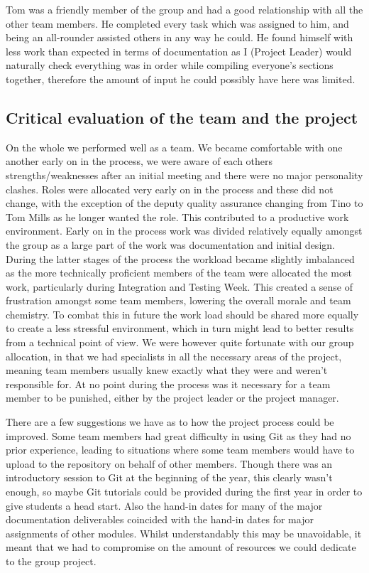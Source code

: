 \documentclass{project}
\begin{document}
Tom was a friendly member of the group and had a good relationship with all the other team members. He completed every task which was assigned to him, and being an all-rounder assisted others in any way he could. He found himself with less work than expected in terms of documentation as I (Project Leader) would naturally check everything was in order while compiling everyone's sections together, therefore the amount of input he could possibly have here was limited.

\subsection{Critical evaluation of the team and the project}
On the whole we performed well as a team. We became comfortable with one another early on in the process, we were aware of each others strengths/weaknesses after an initial meeting and there were no major personality clashes. Roles were allocated very early on in the process and these did not change, with the exception of the deputy quality assurance changing from Tino to Tom Mills as he longer wanted the role. This contributed to a productive work environment. Early on in the process work was divided relatively equally amongst the group as a large part of the work was documentation and initial design. During the latter stages of the process the workload became slightly imbalanced as the more technically proficient members of the team were allocated the most work, particularly during Integration and Testing Week. This created a sense of frustration amongst some team members, lowering the overall morale and team chemistry. To combat this in future the work load should be shared more equally to create a less stressful environment, which in turn might lead to better results from a technical point of view. We were however quite fortunate with our group allocation, in that we had specialists in all the necessary areas of the project, meaning team members usually knew exactly what they were and weren't responsible for. At no point during the process was it necessary for a team member to be punished, either by the project leader or the project manager.

There are a few suggestions we have as to how the project process could be improved. Some team members had great difficulty in using Git as they had no prior experience, leading to situations where some team members would have to upload to the repository on behalf of other members. Though there was an introductory session to Git at the beginning of the year, this clearly wasn't enough, so maybe Git tutorials could be provided during the first year in order to give students a head start. Also the hand-in dates for many of the major documentation deliverables coincided with the hand-in dates for major assignments of other modules. Whilst understandably this may be unavoidable, it meant that we had to compromise on the amount of resources we could dedicate to the group project. 
\end{document}
